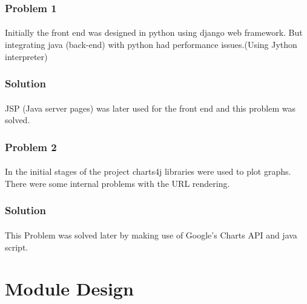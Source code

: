 \documentclass[12pt,a4paper]{report}
\begin{document}
\subsubsection{Problem 1}
\paragraph{}Initially the front end was designed in python using django web framework. But integrating java (back-end) with python had performance issues.(Using Jython interpreter)
\subsubsection{Solution}
\paragraph{}JSP (Java server pages) was later used for the front end and this problem was solved.
\subsubsection{Problem 2}
\paragraph{}In the initial stages of the project charts4j libraries were used to plot graphs. There were some internal problems with the URL rendering.

\subsubsection{Solution}
\paragraph{}This Problem was solved later by making use of Google's Charts API and java script. 


\section{Module Design}
\end{document}
